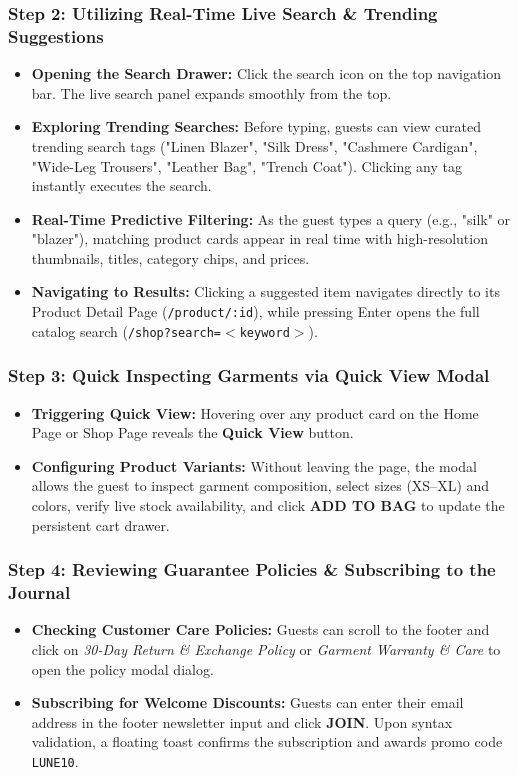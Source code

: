 \documentclass[12pt,a4paper,oneside]{report}
\begin{document}
\subsubsection{Step 2: Utilizing Real-Time Live Search \& Trending Suggestions}
\begin{itemize}[leftmargin=1.2cm]
    \item \textbf{Opening the Search Drawer:} Click the search icon on the top navigation bar. The live search panel expands smoothly from the top.
    \item \textbf{Exploring Trending Searches:} Before typing, guests can view curated trending search tags ("Linen Blazer", "Silk Dress", "Cashmere Cardigan", "Wide-Leg Trousers", "Leather Bag", "Trench Coat"). Clicking any tag instantly executes the search.
    \item \textbf{Real-Time Predictive Filtering:} As the guest types a query (e.g., "silk" or "blazer"), matching product cards appear in real time with high-resolution thumbnails, titles, category chips, and prices.
    \item \textbf{Navigating to Results:} Clicking a suggested item navigates directly to its Product Detail Page (\texttt{/product/:id}), while pressing Enter opens the full catalog search (\texttt{/shop?search=$<$keyword$>$}).
\end{itemize}

\subsubsection{Step 3: Quick Inspecting Garments via Quick View Modal}
\begin{itemize}[leftmargin=1.2cm]
    \item \textbf{Triggering Quick View:} Hovering over any product card on the Home Page or Shop Page reveals the \textbf{Quick View} button.
    \item \textbf{Configuring Product Variants:} Without leaving the page, the modal allows the guest to inspect garment composition, select sizes (XS--XL) and colors, verify live stock availability, and click \textbf{ADD TO BAG} to update the persistent cart drawer.
\end{itemize}

\subsubsection{Step 4: Reviewing Guarantee Policies \& Subscribing to the Journal}
\begin{itemize}[leftmargin=1.2cm]
    \item \textbf{Checking Customer Care Policies:} Guests can scroll to the footer and click on \textit{30-Day Return \& Exchange Policy} or \textit{Garment Warranty \& Care} to open the policy modal dialog.
    \item \textbf{Subscribing for Welcome Discounts:} Guests can enter their email address in the footer newsletter input and click \textbf{JOIN}. Upon syntax validation, a floating toast confirms the subscription and awards promo code \texttt{LUNE10}.
\end{itemize}
\end{document}
